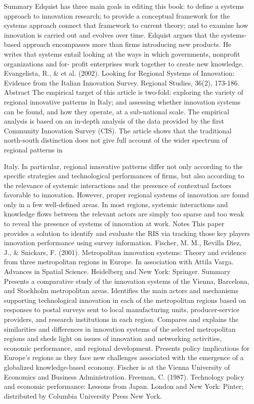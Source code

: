 \documentclass[a4paper,11pt]{article}
\begin{document}
Summary
Edquist has three main goals in editing this book: to define a systems approach to innovation research; to provide a conceptual framework for the systems approach connect that framework to current theory; and to examine how innovation is carried out and evolves over time. Edquist argues that the systems-based approach encompasses more than firms introducing new products. He writes that systems entail looking at the ways in which governments, nonprofit organizations and for- profit enterprises work together to create new knowledge.
Evangelista, R., & et al. (2002). Looking for Regional Systems of Innovation: Evidence from the Italian Innovation Survey. Regional Studies, 36(2), 173-186.
Abstract
The empirical target of this article is two-fold: exploring the variety of regional innovative patterns in Italy; and assessing whether innovation systems can be found, and how they operate, at a sub-national scale. The empirical analysis is based on an in-depth analysis of the data provided by the first Community Innovation Survey (CIS). The article shows that the traditional north-south distinction does not give full account of the wider spectrum of regional patterns in
 


Italy. In particular, regional innovative patterns differ not only according to the specific strategies and technological performances of firms, but also according to the relevance of systemic interactions and the presence of contextual factors favorable to innovation. However, proper regional systems of innovation are found only in a few well-defined areas. In most regions, systemic interactions and knowledge flows between the relevant actors are simply too sparse and too weak to reveal the presence of systems of innovation at work.
Notes
This paper provides a solution to identify and evaluate the RIS via tracking those key players innovation performance using survey information.
Fischer, M. M., Revilla Diez, J., & Snickars, F. (2001). Metropolitan innovation systems: Theory and evidence from three metropolitan regions in Europe. In association with Attila Varga. Advances in Spatial Science. Heidelberg and New York: Springer.
Summary
Presents a comparative study of the innovation systems of the Vienna, Barcelona, and Stockholm metropolitan areas. Identifies the main actors and mechanisms supporting technological innovation in each of the metropolitan regions based on responses to postal surveys sent to local manufacturing units, producer-service providers, and research institutions in each region. Compares and explains the similarities and differences in innovation systems of the selected metropolitan regions and sheds light on issues of innovation and networking activities, economic performance, and regional development. Presents policy implications for Europe's regions as they face new challenges associated with the emergence of a globalized knowledge-based economy. Fischer is at the Vienna University of Economics and Business Administration.
Freeman, C. (1987). Technology policy and economic performance: Lessons from Japan. London and New York: Pinter; distributed by Columbia University Press New York.
 
\end{document}
